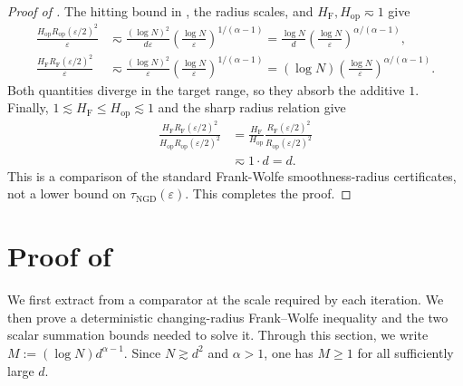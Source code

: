\documentclass[11pt]{article}
\theoremstyle{definition}
\newcommand{\eps}{\varepsilon}
\newcommand{\HF}{H_{\mathrm F}}
\newcommand{\Hop}{H_{\mathrm{op}}}
\begin{document}
\begin{proof}[Proof of ]
The hitting bound in , the radius scales, and
$\HF,\Hop\eqsim1$ give
\begin{align*}
 \frac{\Hop R_{\mathrm{op}}(\eps/2)^2}{\eps}
 &\eqsim
 \frac{(\log N)^2}{d\eps}
 \left(\frac{\log N}{\eps}\right)^{1/(\alpha-1)}=\frac{\log N}{d}
 \left(\frac{\log N}{\eps}\right)^{\alpha/(\alpha-1)},\\
 \frac{\HF R_{\mathrm F}(\eps/2)^2}{\eps}
 &\eqsim
 \frac{(\log N)^2}{\eps}
 \left(\frac{\log N}{\eps}\right)^{1/(\alpha-1)}=(\log N)
 \left(\frac{\log N}{\eps}\right)^{\alpha/(\alpha-1)}.
\end{align*}
Both quantities diverge in the target range, so they absorb the additive
$1$.  Finally, $1\lesssim\HF\leq\Hop\lesssim1$ and the sharp radius relation
give
\begin{align*}
 \frac{\HF R_{\mathrm F}(\eps/2)^2}
 {\Hop R_{\mathrm{op}}(\eps/2)^2}
 &=\frac{\HF}{\Hop}
 \frac{R_{\mathrm F}(\eps/2)^2}{R_{\mathrm{op}}(\eps/2)^2}\\
 &\eqsim 1\cdot d=d.
\end{align*}
This is a comparison of the standard Frank-Wolfe smoothness-radius
certificates, not a lower bound on $\tau_{\mathrm{NGD}}(\eps)$.  This
completes the proof.
\end{proof}


\section{Proof of }

We first extract from  a comparator at the scale
required by each iteration.  We then prove a deterministic
changing-radius Frank--Wolfe inequality and the two scalar summation bounds
needed to solve it.
Through this section, we write $M:=(\log N)d^{\alpha-1}.$
Since $N\gtrsim d^2$ and $\alpha>1$, one has $M\geq1$ for all
sufficiently large $d$.
\end{document}
